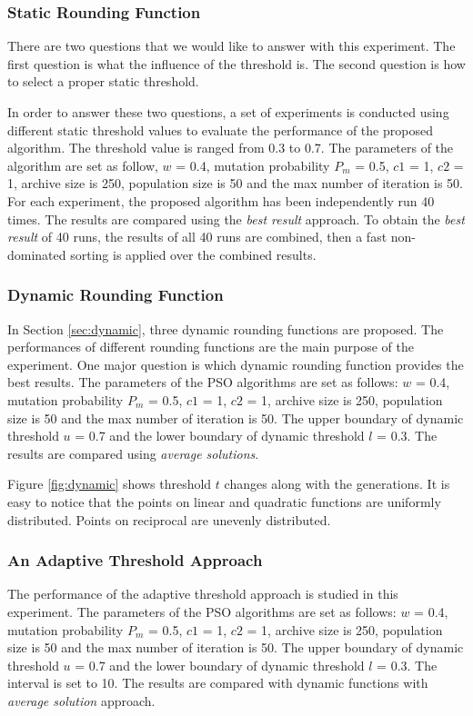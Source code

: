 
\subsubsection{Static Rounding Function}
\label{sec:static_exp}
There are two questions that we would like to answer with this experiment. 
The first question is what the influence of the threshold is. The second question is how to select a proper static threshold. 

In order to answer these two questions, a set of experiments is conducted using different static threshold values to evaluate the performance of 
the proposed algorithm.
The threshold value is ranged from 0.3 to 0.7.  
The parameters of the algorithm are set as follow, $w$ = 0.4, mutation probability $P_m$ = 0.5, $c1$ = 1, $c2$ = 1, archive size is 250, population size is  50 and
the max number of iteration is 50. For each experiment, the proposed algorithm has been independently run 40 times. 
The results are compared using the \emph{best result} approach. To obtain the \emph{best result} of 40 runs, the results of all 40 runs are combined, 
then a fast non-dominated sorting is applied over the combined results. 
\subsubsection{Dynamic Rounding Function}
In Section \ref{sec:dynamic}, three dynamic rounding functions are proposed. 
The performances of different rounding functions are the main purpose of the experiment. One major question is which dynamic rounding function provides the 
best results.
The parameters of the PSO algorithms are set as follows: $w$ = 0.4, mutation probability $P_m$ = 0.5, $c1$ = 1, $c2$ = 1, archive size is 250, 
population size is 50 and
the max number of iteration is 50. The upper boundary of dynamic threshold $u$ = 0.7 and the lower boundary of dynamic threshold $l$ = 0.3. 
The results are compared using \emph{average solutions}.

Figure \ref{fig:dynamic} shows threshold $t$ changes along with the generations. It is easy to notice that the points on linear and quadratic functions are 
uniformly distributed. Points on reciprocal are unevenly distributed.

\subsubsection{An Adaptive Threshold Approach}
The performance of the adaptive threshold approach is studied in this experiment.
The parameters of the PSO algorithms are set as follows: $w$ = 0.4, mutation probability $P_m$ = 0.5, $c1$ = 1, $c2$ = 1, archive size is 250, 
population size is 50 and
the max number of iteration is 50. The upper boundary of dynamic threshold $u$ = 0.7 and the lower boundary of dynamic threshold $l$ = 0.3. 
The interval is set to 10. The results are compared with dynamic functions with \emph{average solution} approach.



